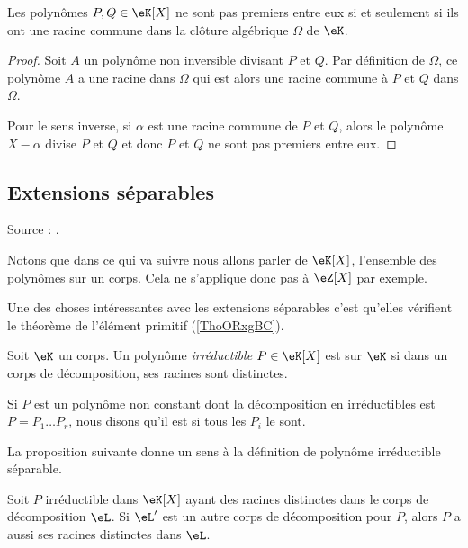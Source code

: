 \begin{lemma}
    Les polynômes \( P,Q\in \eK[X]\) ne sont pas premiers entre eux si et seulement si ils ont une racine commune dans la clôture algébrique \( \Omega\) de \( \eK\).
\end{lemma}

\begin{proof}
    Soit \( A\) un polynôme non inversible divisant \( P\) et $Q$. Par définition de \( \Omega\), ce polynôme \( A\) a une racine dans \( \Omega\) qui est alors une racine commune à \( P\) et \( Q\) dans \( \Omega\).

    Pour le sens inverse, si \( \alpha\) est une racine commune de \( P\) et \( Q\), alors le polynôme \( X-\alpha\) divise \( P\) et \( Q\) et donc \( P\) et \( Q \) ne sont pas premiers entre eux.
\end{proof}


\subsection{Extensions séparables}

Source : \cite{vgQYwF}.

Notons que dans ce qui va suivre nous allons parler de \( \eK[X]\), l'ensemble des polynômes sur un corps. Cela ne s'applique donc pas à \( \eZ[X]\) par exemple.

Une des choses intéressantes avec les extensions séparables c'est qu'elles vérifient le théorème de l'élément primitif (\ref{ThoORxgBC}).

\begin{definition}
    Soit \( \eK\) un corps. Un polynôme \emph{irréductible} \( P\in \eK[X]\) est  sur $\eK$ si dans un corps de décomposition, ses racines sont distinctes.

    Si \( P\) est un polynôme non constant dont la décomposition en irréductibles est \( P=P_1\ldots P_r\), nous disons qu'il est  si tous les \( P_i\) le sont.
\end{definition}

La proposition suivante donne un sens à la définition de polynôme irréductible séparable.
\begin{proposition}
    Soit \( P\) irréductible dans \( \eK[X]\) ayant des racines distinctes dans le corps de décomposition \( \eL\). Si \( \eL'\) est un autre corps de décomposition pour \( P\), alors \( P\) a aussi ses racines distinctes dans \( \eL\).
\end{proposition}

